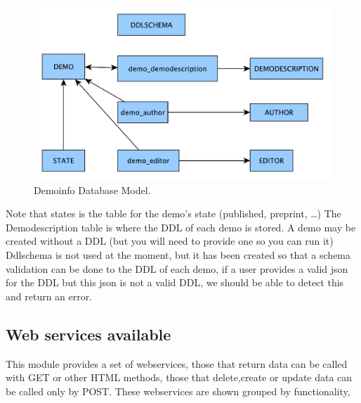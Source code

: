 \begin{figure}[!ht]
\centering
\includegraphics[width=0.8\linewidth]{demo_info/images/demoinfo_model.pdf}
\caption{Demoinfo Database Model. } 
\label{fig:demoinfo_model}
\end{figure}

Note that states is the table for the demo's state (published, preprint, \dots)
The Demodescription table is where the DDL of each demo is stored.
A demo may be created without a DDL (but you will need to provide one so you can run it)
Ddlschema is not used at the moment, but it has been created so that a schema validation can be done to the DDL of each demo, if a user provides a valid json for the DDL but this json is not a valid DDL, we should be able to detect this and return an error.

\subsection{Web services available}
This module provides a set of webservices, those that return data can be called with GET or other HTML methods, those that delete,create or update data can be called only by POST.
These webservices are shown grouped by functionality,


